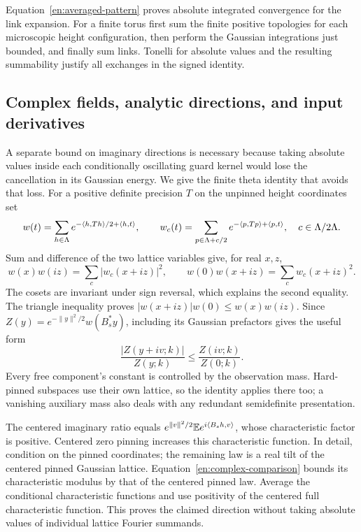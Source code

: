 Equation~\eqref{en:averaged-pattern} proves absolute integrated
convergence for the link expansion.  For a finite torus first sum the
finite positive topologies for each microscopic height configuration,
then perform the Gaussian integrations just bounded, and finally sum
links.  Tonelli for absolute values and the resulting summability
justify all exchanges in the signed identity.

\subsection{Complex fields, analytic directions, and input derivatives}

A separate bound on imaginary directions is necessary because taking
absolute values inside each conditionally oscillating guard kernel
would lose the cancellation in its Gaussian energy.  We give the
finite theta identity that avoids that loss.  For a positive definite
precision $T$ on the unpinned height coordinates set
\[
 w(t)=\sum_{h\in\Lambda}e^{-\langle h,Th\rangle/2+\langle h,t\rangle},\qquad
 w_c(t)=\sum_{p\in\Lambda+c/2}e^{-\langle p,Tp\rangle+\langle p,t\rangle},
                 \quad c\in\Lambda/2\Lambda.
\]
Sum and difference of the two lattice variables give, for real $x,z$,
\begin{equation}\label{en:theta-parity}
 w(x)w(iz)=\sum_c|w_c(x+iz)|^2,
 \qquad w(0)w(x+iz)=\sum_cw_c(x+iz)^2.
\end{equation}
The cosets are invariant under sign reversal, which explains the
second equality.  The triangle inequality proves
$|w(x+iz)|w(0)\leq w(x)w(iz)$.  Since
$Z(y)=e^{-\|y\|^2/2}w(B_s^*y)$, including its Gaussian prefactors
gives the useful form
\begin{equation}\label{en:complex-comparison}
             \frac{|Z(y+iv;k)|}{Z(y;k)}
                         \leq\frac{Z(iv;k)}{Z(0;k)}.
\end{equation}
Every free component's constant is controlled by the observation mass.
Hard-pinned subspaces use their own lattice, so the identity applies
there too; a vanishing auxiliary mass also deals with any redundant
semidefinite presentation.

The centered imaginary ratio equals
$e^{\|v\|^2/2}\mathbb E e^{i\langle B_sh,v\rangle}$, whose characteristic factor is
positive.  Centered zero pinning increases this characteristic
function.  In detail, condition on the pinned coordinates; the
remaining law is a real tilt of the centered pinned Gaussian lattice.
Equation~\eqref{en:complex-comparison} bounds its characteristic
modulus by that of the centered pinned law.  Average the conditional
characteristic functions and use positivity of the centered full
characteristic function.  This proves the claimed direction without
taking absolute values of individual lattice Fourier summands.

